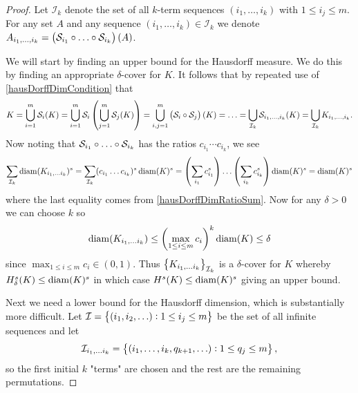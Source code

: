 \begin{proof}
	Let $\mathcal{I}_k$ denote the set of all $k$-term sequences $(i_1, \ldots, i_k)$ with $1 \leq i_j \leq m$. For any set $A$ and any sequence $(i_1, \ldots, i_k)\in \mathcal{I}_k$ we denote $A_{i_1, \ldots, i_k} = \left(\mathcal{S}_{i_1} \circ \ldots \circ \mathcal{S}_{i_k}\right)(A)$.
	
	We will start by finding an upper bound for the Hausdorff measure. We do this by finding an appropriate $\delta$-cover for $K$. It follows that by repeated use of \eqref{hausDorffDimCondition} that
	\begin{equation}
		K = \bigcup_{i = 1}^{m} \mathcal{S}_i(K) =\bigcup_{i = 1}^{m} \mathcal{S}_i \left(\bigcup_{j = 1}^{m} \mathcal{S}_j(K) \right) = \bigcup_{i, j =1}^{m} \left(\mathcal{S}_i \circ \mathcal{S}_j \right)(K) = \ldots =  \bigcup_{\mathcal{I}_k} \mathcal{S}_{i_1, \ldots, i_k}(K) =    \bigcup_{\mathcal{I}_k} K_{i_1, \ldots, i_k}.
	\end{equation}
	Now noting that $\mathcal{S}_{i_1} \circ \ldots \circ \mathcal{S}_{i_k}$ has the ratios $c_{i_1} \cdots c_{i_k}$, we see
	\begin{equation}
		\sum_{\mathcal{I}_k} \diam(K_{i_1, \ldots i_k})^{s} = \sum_{\mathcal{I}_k} (c_{i_1} \dots c_{i_k})^{s} \diam(K)^{s} = \left(\sum_{i_1} c_{i_1}^{s}\right) \dots \left(\sum_{i_k}c_{i_k}^{s}\right) \diam(K)^{s} = \diam(K)^{s}
	\end{equation}
	where the last equality comes from \eqref{hausDorffDimRatioSum}. Now for any $\delta > 0$ we can choose $k$ so 
	\begin{equation}
		\operatorname{diam}(K_{i_1, \ldots i_k}) \leq \left(\max_{1 \leq i \leq m} c_i\right)^{k}\operatorname{diam}(K) \leq \delta
	\end{equation} 
	since $\max_{1 \leq i \leq m} c_i \in (0,1)$. Thus $\cbr{K_{i_1, \ldots i_k}}_{\mathcal{I}_k}$ is a $\delta$-cover for $K$ whereby $H_{\delta}^{s}(K) \leq \operatorname{diam}(K)^{s}$ in which case $H^{s}(K) \leq \operatorname{diam}(K)^{s}$ giving an upper bound.
	
	Next we need a lower bound for the Hausdorff dimension, which is substantially more difficult. Let $\mathcal{I} = \cbr{(i_1, i_2, \ldots) : 1 \leq i_j \leq m}$ be the set of all infinite sequences and let
	\begin{equation}
		\mathcal{I}_{i_1, \ldots i_k} = \cbr{(i_1, \ldots , i_k, q_{k+1}, \ldots ) : 1 \leq q_j \leq m},
	\end{equation}
	so the first initial $k$ "terms" are chosen and the rest are the remaining permutations.
	

\end{proof}

